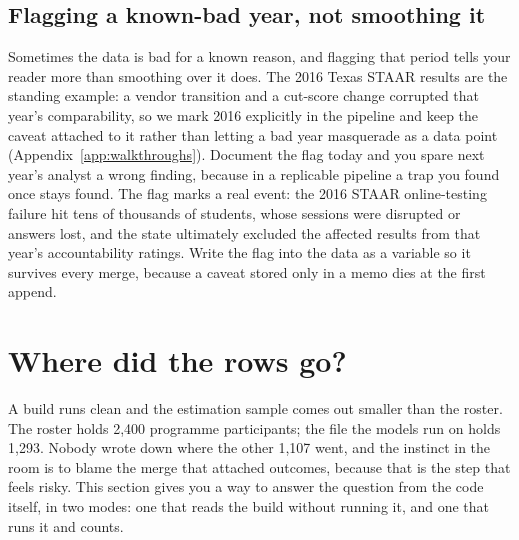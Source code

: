 \documentclass[
    a4paper,
    fontsize=10pt,
    twoside=true,
    numbers=noenddot,
]{kaobook}
\begin{document}
\subsection{Flagging a known-bad year, not smoothing it}\label{sec:ch06-pollutedyear}
Sometimes the data is bad for a known reason, and flagging that period tells your reader more than smoothing over it does. The 2016 Texas STAAR results are the standing example: a vendor transition and a cut-score change corrupted that year's comparability, so we mark 2016 explicitly in the pipeline and keep the caveat attached to it rather than letting a bad year masquerade as a data point (Appendix~\ref{app:walkthroughs}). Document the flag today and you spare next year's analyst a wrong finding, because in a replicable pipeline a trap you found once stays found. The flag marks a real event: the 2016 STAAR online-testing failure hit tens of thousands of students, whose sessions were disrupted or answers lost, and the state ultimately excluded the affected results from that year's accountability ratings. Write the flag into the data as a variable so it survives every merge, because a caveat stored only in a memo dies at the first append.

\section{Where did the rows go?}\label{sec:ch06-mergemap}
A build runs clean and the estimation sample comes out smaller than the roster. The roster holds 2,400 programme participants; the file the models run on holds 1,293. Nobody wrote down where the other 1,107 went, and the instinct in the room is to blame the merge that attached outcomes, because that is the step that feels risky. This section gives you a way to answer the question from the code itself, in two modes: one that reads the build without running it, and one that runs it and counts.
\end{document}
